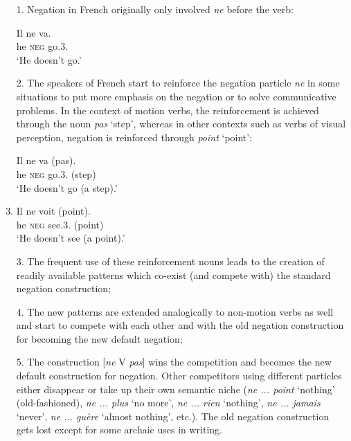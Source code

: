 \begin{enumerate}  
\item[1.]  Negation in French originally only involved {\em ne} before the verb: 
 
\ea
\gll Il ne va.\\
he {\textsc{neg}} go.3{\sg}.{\prs}\\
\glt `He doesn't go.'\\
\z

 \item[2.]  The speakers of French start to reinforce the negation particle {\em ne} in some situations to put more emphasis on the negation or to solve communicative problems. In the context of motion verbs, the reinforcement is achieved through the noun {\em pas} `step', whereas in other contexts such as verbs of visual perception, negation is reinforced through {\em point} `point':
 
\ea
\gll Il ne va (pas).\\
he {\textsc{neg}} go.3{\sg}.{\prs} (step)\\
\glt `He doesn't go (a step).'\\

\item
\gll Il ne voit (point).\\
he {\textsc{neg}} see.3{\sg}.{\prs} (point)\\
\glt `He doesn't see (a point).'\\
\z

 \item[3.]   The frequent use of these reinforcement nouns leads to the creation of readily available patterns which co-exist (and compete with) the standard negation construction;

 \item[4.]  The new patterns are extended analogically to non-motion verbs as well and start to compete with each other and with the old negation construction for becoming the new default negation;


 \item[5.]  The construction [{\em ne} V {\em pas}] wins the competition and becomes the new default construction for negation. Other competitors using different particles either disappear or take up their own semantic niche ({\em ne ... point} `nothing' (old-fashioned), {\em ne ... plus} `no more', {\em ne ... rien} `nothing', {\em ne ... jamais} `never', {\em ne ... gu\`{e}re} `almost nothing', etc.). The old negation construction gets lost except for some archaic uses in writing.
\end{enumerate}

